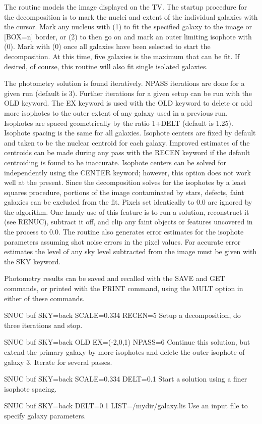 The routine models the image displayed on the TV.  The startup procedure
for the decomposition is to mark the nuclei and extent of the individual
galaxies with the cursor.  Mark any nucleus with (1) to fit the specified
galaxy to the image or {[BOX=n]} border, or (2) to then go on and mark an
outer limiting isophote with (0).  Mark with (0) once all galaxies have
been selected to start the decomposition.  At this time, five galaxies is
the maximum that can be fit.  If desired, of course, this routine will also
fit single isolated galaxies.

The photometry solution is found iteratively.  NPASS iterations are done
for a given run (default is 3).  Further iterations for a given setup can
be run with the OLD keyword.  The EX keyword is used with the OLD keyword
to delete or add more isophotes to the outer extent of any galaxy used in a
previous run.  Isophotes are spaced geometrically by the ratio 1+DELT
(default is 1.25).  Isophote spacing is the same for all galaxies.
Isophote centers are fixed by default and taken to be the nuclear centroid
for each galaxy.  Improved estimates of the centroids can be made during
any pass with the RECEN keyword if the default centroiding is found to be
inaccurate. Isophote centers can be solved for independently using the
CENTER keyword; however, this option does not work well at the present.
Since the decomposition solves for the isophotes by a least squares
procedure, portions of the image contaminated by stars, defects, faint
galaxies can be excluded from the fit.  Pixels set identically to 0.0 are
ignored by the algorithm.  One handy use of this feature is to run a
solution, reconstruct it (see RENUC), subtract it off, and clip any faint
objects or features uncovered in the process to 0.0.  The routine also
generates error estimates for the isophote parameters assuming shot noise
errors in the pixel values.  For accurate error estimates the level of any
sky level subtracted from the image must be given with the SKY keyword.

Photometry results can be saved and recalled with the SAVE and GET
commands, or printed with the PRINT command, using the MULT option in
either of these commands.
\begin{example}
  \item[SNUC buf SKY=back SCALE=0.334 RECEN=5\hfill]{Setup a
       decomposition, do three iterations and stop.}

  \item[SNUC buf SKY=back OLD EX=(-2,0,1) NPASS=6\hfill]{Continue this
       solution, but extend the primary galaxy by more isophotes and delete
       the outer isophote of galaxy 3.  Iterate for several passes.}

  \item[SNUC buf SKY=back SCALE=0.334 DELT=0.1\hfill]{Start a solution
       using a finer isophote spacing.}

  \item[SNUC buf SKY=back DELT=0.1 LIST=/mydir/galaxy.lis\hfill]{Use an
       input file to specify galaxy parameters.}
\end{example}

